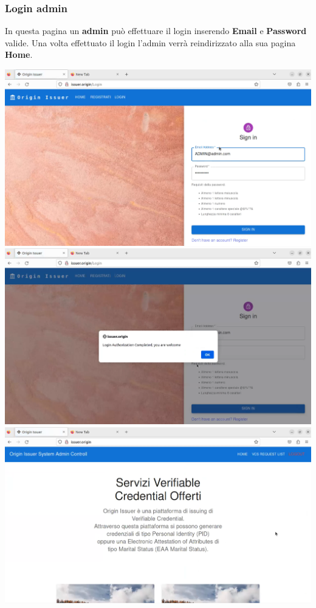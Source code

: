 \subsubsection{Login admin}
In questa pagina un \textbf{admin} può effettuare il login inserendo \textbf{Email} e \textbf{Password} valide. Una volta effettuato il login l'admin verrà reindirizzato alla sua pagina \textbf{Home}.
\begin{center}
\includegraphics[scale = 0.2]{./res/img/issuer/new/loginadmin1.png}
\includegraphics[scale = 0.2]{./res/img/issuer/new/loginadmin2.png}
\includegraphics[scale = 0.2]{./res/img/issuer/new/loginadmin3.png}
\end{center}

